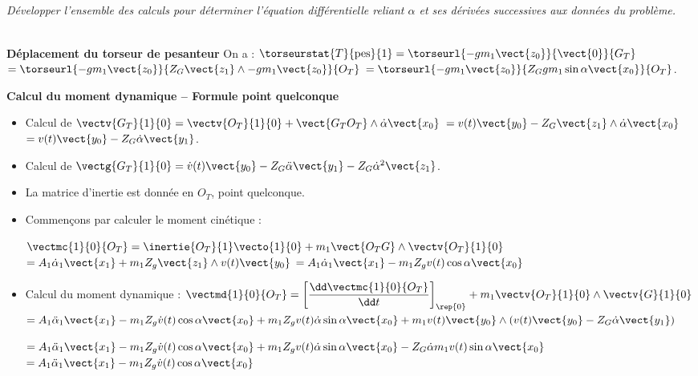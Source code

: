 \begin{multicols}{2}
\subparagraph{} \textit{Développer l'ensemble des calculs pour déterminer l'équation différentielle reliant $\alpha$ et ses dérivées
successives aux données du problème.}
\ifprof
\begin{corrige} ~\\

\textbf{Déplacement du torseur de pesanteur}
On a : $\torseurstat{T}{\text{pes}}{1} = \torseurl{-gm_1\vect{z_0}}{\vect{0}}{G_T}$ 
$= \torseurl{-gm_1\vect{z_0}}{Z_G \vect{z_1}\wedge -gm_1\vect{z_0}}{O_T}$
$= \torseurl{-gm_1\vect{z_0}}{Z_G gm_1\sin\alpha \vect{x_0}}{O_T}$.


\textbf{Calcul du moment dynamique -- Formule point quelconque} 
\begin{itemize}
\item Calcul de $\vectv{G_T}{1}{0} =\vectv{O_T}{1}{0} + \vect{G_TO_T} \wedge \dot{\alpha} \vect{x_0}$
$=v(t)\vect{y_0}-Z_G\vect{z_1} \wedge \dot{\alpha}\vect{x_0}$
$=v(t)\vect{y_0}-Z_G \dot{\alpha}\vect{y_1}$.

\item Calcul de $\vectg{G_T}{1}{0} = \dot{v}(t)\vect{y_0} - Z_G \ddot{\alpha}\vect{y_1} -Z_G \dot{\alpha}^2\vect{z_1}$.

 \item  La matrice d'inertie est donnée en $O_T$, point quelconque. 

\item Commençons par calculer le moment cinétique : 
 
$\vectmc{1}{0}{O_T} = \inertie{O_T}{1}\vecto{1}{0}+m_1\vect{O_TG} \wedge \vectv{O_T}{1}{0}$
$=A_1\dot{\alpha}_1 \vect{x_1}  + m_1 Z_g\vect{z_1} \wedge v(t) \vect{y_0}$
$=A_1\dot{\alpha}_1 \vect{x_1}  - m_1 Z_g v(t)  \cos \alpha \vect{x_0}$ %


\item Calcul du moment dynamique :
  $\vectmd{1}{0}{O_T}=\left[\dfrac{\dd \vectmc{1}{0}{O_T}  }{\dd t }\right]_{\rep{0}} + m_1 \vectv{O_T}{1}{0}\wedge \vectv{G}{1}{0}$
$=A_1\ddot{\alpha}_1 \vect{x_1}  - m_1 Z_g \dot{v}(t)  \cos \alpha \vect{x_0} + m_1 Z_g v(t) \dot{\alpha} \sin \alpha \vect{x_0} + m_1 v(t) \vect{y_0}  \wedge \left(v(t)\vect{y_0}-Z_G \dot{\alpha}\vect{y_1}\right) $

$=A_1\ddot{\alpha}_1 \vect{x_1}  - m_1 Z_g \dot{v}(t)  \cos \alpha \vect{x_0} + m_1 Z_g v(t) \dot{\alpha} \sin \alpha \vect{x_0} -Z_G \dot{\alpha} m_1 v(t) \sin \alpha  \vect{x_0}  $
$=A_1\ddot{\alpha}_1 \vect{x_1}  - m_1 Z_g \dot{v}(t)  \cos \alpha \vect{x_0}  $


\end{itemize}
\end{corrige}
\end{multicols}
